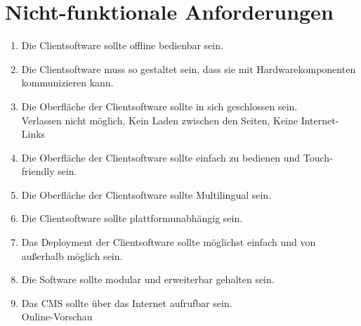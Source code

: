 \section{Nicht-funktionale Anforderungen}
\label{section:nicht-funktionale}

\begin{enumerate}[label=NFA\arabic*]
	\item\label{nfa1} Die Clientsoftware sollte offline bedienbar sein.
	\item\label{nfa2} Die Clientsoftware muss so gestaltet sein, dass sie mit Hardwarekomponenten kommunizieren kann.
  \item\label{nfa3} Die Oberfläche der Clientsoftware sollte in sich geschlossen sein.\\
  Verlassen nicht möglich, Kein Laden zwischen den Seiten, Keine Internet-Links
  \item\label{nfa4} Die Oberfläche der Clientsoftware sollte einfach zu bedienen und Touch-friendly sein.
  \item\label{nfa5} Die Oberfläche der Clientsoftware sollte Multilingual sein.
  \item\label{nfa6} Die Clientsoftware sollte plattformunabhängig sein.
  \item\label{nfa7} Das Deployment der Clientsoftware sollte möglichst einfach und von außerhalb möglich sein.
  \item\label{nfa8} Die Software sollte modular und erweiterbar gehalten sein.
  \item\label{nfa9} Das CMS sollte über das Internet aufrufbar sein.\\
  Online-Vorschau
\end{enumerate}
